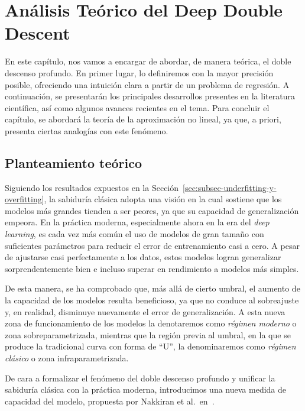 
\chapter{Análisis Teórico del Deep Double Descent}\label{ch:analisis-teorico-ddd}

En este capítulo, nos vamos a encargar de abordar, de manera teórica, el doble descenso profundo. En primer lugar, lo definiremos con la mayor precisión posible, ofreciendo una intuición clara a partir de un problema de regresión. A continuación, se presentarán los principales desarrollos presentes en la literatura científica, así como algunos avances recientes en el tema. Para concluir el capítulo, se abordará la teoría de la aproximación no lineal, ya que, a priori, presenta ciertas analogías con este fenómeno.

\section{Planteamiento teórico}\label{sec:planteamiento-teorico}

Siguiendo los resultados expuestos en la Sección~\ref{sec:subsec-underfitting-y-overfitting}, la sabiduría clásica adopta una visión en la cual sostiene que los modelos más grandes tienden a ser peores, ya que su capacidad de generalización empeora. En la práctica moderna, especialmente ahora en la era del \textit{deep learning}, es cada vez más común el uso de modelos de gran tamaño con suficientes parámetros para reducir el error de entrenamiento casi a cero. A pesar de ajustarse casi perfectamente a los datos, estos modelos logran generalizar sorprendentemente bien e incluso superar en rendimiento a modelos más simples.

De esta manera, se ha comprobado que, más allá de cierto umbral, el aumento de la capacidad de los modelos resulta beneficioso, ya que no conduce al sobreajuste y, en realidad, disminuye nuevamente el error de generalización. A esta nueva zona de funcionamiento de los modelos la denotaremos como \emph{régimen moderno} o zona sobreparametrizada, mientras que la región previa al umbral, en la que se produce la tradicional curva con forma de ``U'', la denominaremos como \textit{régimen clásico} o zona infraparametrizada.

De cara a formalizar el fenómeno del doble descenso profundo y unificar la sabiduría clásica con la práctica moderna, introducimos una nueva medida de capacidad del modelo, propuesta por Nakkiran et al.\ en~\cite{Nakkiran2019}.

